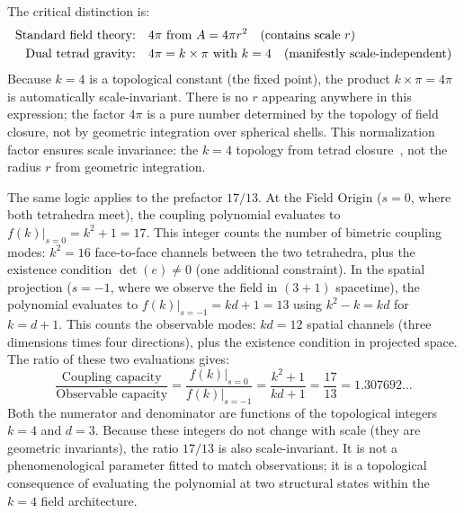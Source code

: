 \documentclass[aps,prd,preprint,superscriptaddress,showpacs,preprintnumbers,amsmath,amssymb,nofootinbib]{revtex4-2}
\begin{document}
The critical distinction is:
\begin{align}
\text{Standard field theory:} \quad & 4\pi \text{ from } A = 4\pi r^2 \quad \text{(contains scale } r\text{)} \notag \\
\text{Dual tetrad gravity:} \quad & 4\pi = k \times \pi \text{ with } k=4 \quad \text{(manifestly scale-independent)}
\label{eq:4pi-distinction}
\end{align}
Because $k=4$ is a topological constant (the fixed point), the product $k\times\pi = 4\pi$ is automatically scale-invariant. There is no $r$ appearing anywhere in this expression; the factor $4\pi$ is a pure number determined by the topology of field closure, not by geometric integration over spherical shells. This normalization factor ensures scale invariance: the $k=4$ topology from tetrad closure~\cite{mtw1973,wald1984}, not the radius $r$ from geometric integration.

The same logic applies to the prefactor $17/13$. At the Field Origin ($s=0$, where both tetrahedra meet), the coupling polynomial evaluates to $f(k)|_{s=0} = k^2 + 1 = 17$. This integer counts the number of bimetric coupling modes: $k^2 = 16$ face-to-face channels between the two tetrahedra, plus the existence condition $\det(e) \neq 0$ (one additional constraint). In the spatial projection ($s=-1$, where we observe the field in $(3+1)$ spacetime), the polynomial evaluates to $f(k)|_{s=-1} = kd+1 = 13$ using $k^2 - k = kd$ for $k = d+1$. This counts the observable modes: $kd = 12$ spatial channels (three dimensions times four directions), plus the existence condition in projected space. The ratio of these two evaluations gives:
\begin{equation}
\frac{\text{Coupling capacity}}{\text{Observable capacity}}
= \frac{f(k)|_{s=0}}{f(k)|_{s=-1}}
= \frac{k^2+1}{kd+1}
= \frac{17}{13}
= 1.307692\ldots
\label{eq:coupling-ratio}
\end{equation}
Both the numerator and denominator are functions of the topological integers $k=4$ and $d=3$. Because these integers do not change with scale (they are geometric invariants), the ratio $17/13$ is also scale-invariant. It is not a phenomenological parameter fitted to match observations; it is a topological consequence of evaluating the polynomial at two structural states within the $k=4$ field architecture.
\end{document}
